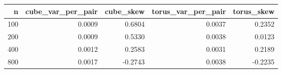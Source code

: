 \begin{tabular}{rrrrr}
\toprule
n & cube_var_per_pair & cube_skew & torus_var_per_pair & torus_skew \\
\midrule
100 & 0.0009 & 0.6804 & 0.0037 & 0.2352 \\
200 & 0.0009 & 0.5330 & 0.0038 & 0.0123 \\
400 & 0.0012 & 0.2583 & 0.0031 & 0.2189 \\
800 & 0.0017 & -0.2743 & 0.0038 & -0.2235 \\
\bottomrule
\end{tabular}
